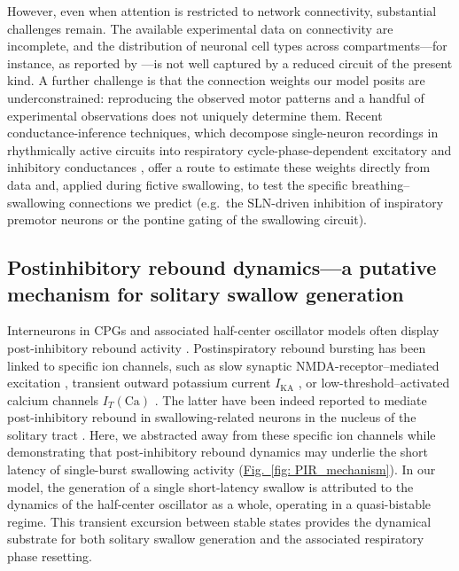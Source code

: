\documentclass[pdflatex,sn-mathphys-ay]{sn-jnl}%
\renewcommand{\figureautorefname}{Fig.}
\newcommand{\Figref}[2][]{\hyperref[#2]{\figureautorefname~\ref*{#2}#1}}
\theoremstyle{thmstyleone}%
\theoremstyle{thmstyletwo}%
\theoremstyle{thmstylethree}%
\begin{document}
However, even when attention is restricted to network connectivity, substantial challenges remain. The available experimental data on connectivity are incomplete, and the distribution of neuronal cell types across compartments---for instance, as reported by \citet{molkov2025inference}---is not well captured by a reduced circuit of the present kind.
A further challenge is that the connection weights our model posits are underconstrained: reproducing the observed motor patterns and a handful of experimental observations does not uniquely determine them.
Recent conductance-inference techniques, which decompose single-neuron recordings in rhythmically active circuits into respiratory cycle-phase-dependent excitatory and inhibitory conductances \citep{molkov2025inference, molkov2026functional}, offer a route to estimate these weights directly from data and, applied during fictive swallowing, to test the specific breathing--swallowing connections we predict (e.g.\ the SLN-driven inhibition of inspiratory premotor neurons or the pontine gating of the swallowing circuit).

\subsection{Postinhibitory rebound dynamics---a putative mechanism for solitary swallow generation}
Interneurons in CPGs and associated half-center oscillator models often display post-inhibitory rebound activity \citep{hooper2001central, bucher2015central, nagornov2016mixed, jean2001brain}. Postinspiratory rebound bursting has been linked to specific ion channels, such as slow synaptic NMDA-receptor–mediated excitation \citep{jean2001brain, tell1993ionic}, transient outward potassium current $I_{\text{KA}}$ \citep{jean2001brain, tell1991activation}, or low-threshold–activated calcium channels $I_T(\text{Ca})$ \citep{tell1994whole, champagnat1986voltage, jean2006electrophysiologic}. The latter have been indeed reported to mediate post-inhibitory rebound in swallowing-related neurons in the nucleus of the solitary tract \citep{tell1994whole, champagnat1986voltage, jean2006electrophysiologic}.
Here, we abstracted away from these specific ion channels while demonstrating that post-inhibitory rebound dynamics may underlie the short latency of single-burst swallowing activity (\Figref[]{fig: PIR_mechanism}). In our model, the generation of a single short-latency swallow is attributed to the dynamics of the half-center oscillator as a whole, operating in a quasi-bistable regime. This transient excursion between stable states provides the dynamical substrate for both solitary swallow generation and the associated respiratory phase resetting.
\end{document}
